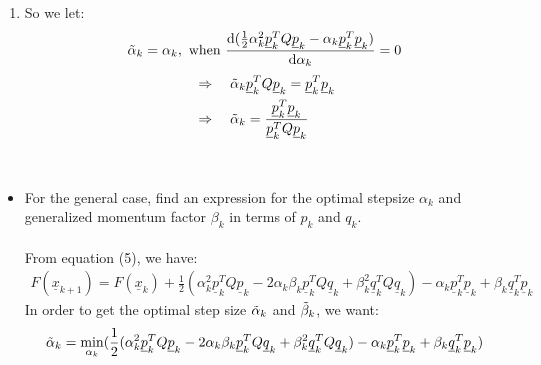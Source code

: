 \documentclass[11pt,letterpaper]{article}
\begin{document}
\begin{tcolorbox}
    \begin{enumerate}[\quad\quad]
        \item
        So we let:
        \begin{align*}
            \Tilde{\alpha}_k = \alpha_k, \text{ when } 
            \frac{\mathrm{d}
            (\frac{1}{2} 
            \alpha_k^2 \underline p_k^T Q \underline p_k
            - \alpha_k \underline p_k^T \underline p_k)}
            {\mathrm{d} \alpha_k}
            =0
        \end{align*}
        \begin{align*}
            &\Rightarrow \quad
            \Tilde{\alpha}_k \underline p_k^T Q \underline p_k = \underline p_k^T \underline p_k
            \\
            &\Rightarrow \quad
            \Tilde{\alpha}_k = 
            \frac{\underline p_k^T \underline p_k}
            {\underline p_k^T Q \underline p_k} 
        \end{align*}
    \end{enumerate}
    \\
    \begin{itemize}
        \item For the general case, find an expression for the optimal stepsize $\alpha_k$ and generalized momentum factor $\beta_k$ in terms of $p_k$ and $q_k$.
        \\
        \\
        From equation (5), we have:
        \begin{align*}
             F(\underline x_{k+1}) = F(\underline x_{k}) + \frac{1}{2} 
            (\alpha_k^2 \underline p_k^T Q \underline p_k 
            - 2\alpha_k\beta_k \underline p_k^T Q \underline q_k 
            + \beta_k^2 \underline q_k^T Q \underline q_k)
            - \alpha_k \underline p_k^T \underline p_k 
            + \beta_k \underline q_k^T \underline p_k
        \end{align*}
        In order to get the optimal step size $\Tilde{\alpha}_k$ and $\Tilde{\beta}_k$, we want:
        \begin{align*}
            \Tilde{\alpha}_k = \min_{\alpha_k}(\frac{1}{2} 
            (\alpha_k^2 \underline p_k^T Q \underline p_k 
            - 2\alpha_k\beta_k \underline p_k^T Q \underline q_k 
            + \beta_k^2 \underline q_k^T Q \underline q_k)
            - \alpha_k \underline p_k^T \underline p_k 
            + \beta_k \underline q_k^T \underline p_k)\\

\end{align*}
\end{itemize}
\end{tcolorbox}
\end{document}

